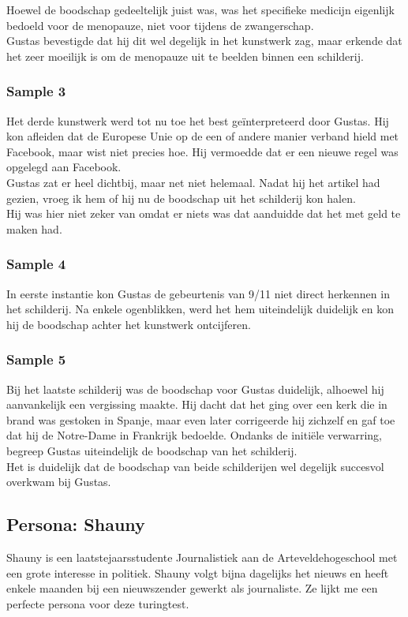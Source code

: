 Hoewel de boodschap gedeeltelijk juist was, was het specifieke medicijn eigenlijk bedoeld voor de menopauze, niet voor tijdens de zwangerschap. \\

Gustas bevestigde dat hij dit wel degelijk in het kunstwerk zag, maar erkende dat het zeer moeilijk is om de menopauze uit te beelden binnen een schilderij.

\subsubsection{Sample 3}
Het derde kunstwerk werd tot nu toe het best geïnterpreteerd door Gustas. Hij kon afleiden dat de Europese Unie op de een of andere manier verband hield met Facebook, maar wist niet precies hoe. Hij vermoedde dat er een nieuwe regel was opgelegd aan Facebook. \\

Gustas zat er heel dichtbij, maar net niet helemaal. Nadat hij het artikel had gezien, vroeg ik hem of hij nu de boodschap uit het schilderij kon halen. \\

Hij was hier niet zeker van omdat er niets was dat aanduidde dat het met geld te maken had.

\subsubsection{Sample 4}
In eerste instantie kon Gustas de gebeurtenis van 9/11 niet direct herkennen in het schilderij. Na enkele ogenblikken, werd het hem uiteindelijk duidelijk en kon hij de boodschap achter het kunstwerk ontcijferen.

\subsubsection{Sample 5}
Bij het laatste schilderij was de boodschap voor Gustas duidelijk, alhoewel hij aanvankelijk een vergissing maakte. Hij dacht dat het ging over een kerk die in brand was gestoken in Spanje, maar even later corrigeerde hij zichzelf en gaf toe dat hij de Notre-Dame in Frankrijk bedoelde. Ondanks de initiële verwarring, begreep Gustas uiteindelijk de boodschap van het schilderij. \\

Het is duidelijk dat de boodschap van beide schilderijen wel degelijk succesvol overkwam bij Gustas.

\subsection{Persona: Shauny}
Shauny is een laatstejaarsstudente Journalistiek aan de Arteveldehogeschool met een grote interesse in politiek. Shauny volgt bijna dagelijks het nieuws en heeft enkele maanden bij een nieuwszender gewerkt als journaliste. Ze lijkt me een perfecte persona voor deze turingtest.

